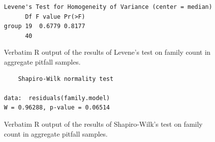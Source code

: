 \documentclass[10pt,letterpaper,twocolumn]{article}
\begin{document}
\begin{figure}[h]
	\lstset{numbers=left}
	\lstset{xleftmargin=5mm,framexleftmargin=5mm}
	\begin{lstlisting}
Levene's Test for Homogeneity of Variance (center = median)
      Df F value Pr(>F)
group 19  0.6779 0.8177
      40               
	\end{lstlisting}
	\caption{Verbatim R output of the results of Levene's test on family count in aggregate pitfall samples.}
	\label{fig:bulk_pitfall_family_levene}
	\smallskip
	\nointerlineskip
	\hrulefill
\end{figure}

\begin{figure}[h]
	\lstset{numbers=left}
	\lstset{xleftmargin=5mm,framexleftmargin=5mm}
	\begin{lstlisting}
	Shapiro-Wilk normality test

data:  residuals(family.model)
W = 0.96288, p-value = 0.06514
	\end{lstlisting}
	\caption{Verbatim R output of the results of Shapiro-Wilk's test on family count in aggregate pitfall samples.}
	\label{fig:bulk_pitfall_family_shapiro}
	\smallskip
	\nointerlineskip
	\hrulefill
\end{figure}
\end{document}
